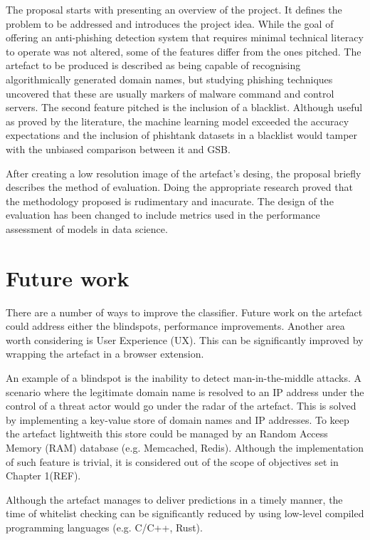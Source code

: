The proposal starts with presenting an overview of the project. It defines the problem to be addressed and introduces the project idea. While the goal of offering an anti-phishing detection system that requires minimal technical literacy to operate was not altered, some of the features differ from the ones pitched. The artefact to be produced is described as being capable of recognising algorithmically generated domain names, but studying phishing techniques uncovered that these are usually markers of malware command and control servers. The second feature pitched is the inclusion of a blacklist. Although useful as proved by the literature, the machine learning model exceeded the accuracy expectations and the inclusion of phishtank datasets in a blacklist would tamper with the unbiased comparison between it and GSB.

After creating a low resolution image of the artefact's desing, the proposal briefly describes the method of evaluation. Doing the appropriate research proved that the methodology proposed is rudimentary and inacurate. The design of the evaluation has been changed to include metrics used in the performance assessment of models in data science.

\section{Future work}
There are a number of ways to improve the classifier. Future work on the artefact could address either the blindspots, performance improvements. Another area worth considering is User Experience (UX). This can be significantly improved by wrapping the artefact in a browser extension.

An example of a blindspot is the inability to detect man-in-the-middle attacks. A scenario where the legitimate domain name is resolved to an IP address under the control of a threat actor would go under the radar of the artefact. This is solved by implementing a key-value store of domain names and IP addresses. To keep the artefact lightweith this store could be managed by an Random Access Memory (RAM) database (e.g. Memcached, Redis). Although the implementation of such feature is trivial, it is considered out of the scope of objectives set in Chapter 1(REF).

Although the artefact manages to deliver predictions in a timely manner, the time of whitelist checking can be significantly reduced by using low-level compiled programming languages (e.g. C/C++, Rust). 

